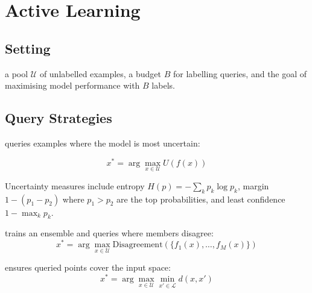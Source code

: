 \newpage
\section{Active Learning}


\subsection{Setting}

 a pool $\mathcal{U}$ of unlabelled examples, a budget $B$ for labelling queries, and the goal of maximising model performance with $B$ labels.

\subsection{Query Strategies}

 queries examples where the model is most uncertain:

\begin{equation}
    x^* = \arg\max_{x \in \mathcal{U}} U(f(x))
\end{equation}

Uncertainty measures include entropy $H(p) = -\sum_k p_k \log p_k$, margin $1 - (p_1 - p_2)$ where $p_1 > p_2$ are the top probabilities, and least confidence $1 - \max_k p_k$.

 trains an ensemble and queries where members disagree:
\begin{equation}
    x^* = \arg\max_{x \in \mathcal{U}} \text{Disagreement}(\{f_1(x), \ldots, f_M(x)\})
\end{equation}

 ensures queried points cover the input space:
\begin{equation}
    x^* = \arg\max_{x \in \mathcal{U}} \min_{x' \in \mathcal{L}} d(x, x')
\end{equation}

